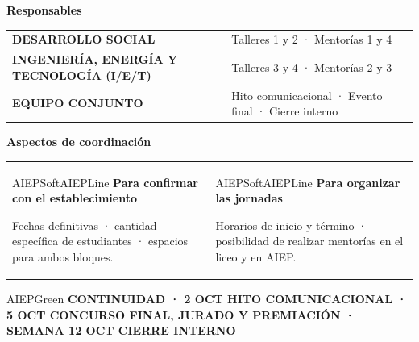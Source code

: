 \documentclass[10pt,a4paper]{article}
\begin{document}
\vspace{4mm}
{\Large\bfseries\color{AIEPNavy}Responsables\par}
\vspace{2mm}
\renewcommand{\arraystretch}{1.32}
\begin{tabularx}{\textwidth}{@{}L{58mm}Y@{}}
{\bfseries\color{AIEPRed}DESARROLLO SOCIAL} & Talleres 1 y 2 · Mentorías 1 y 4 \\[1.3mm]
{\bfseries\color{AIEPNavyMid}INGENIERÍA, ENERGÍA Y TECNOLOGÍA (I/E/T)} & Talleres 3 y 4 · Mentorías 2 y 3 \\[1.3mm]
{\bfseries\color{AIEPGreen}EQUIPO CONJUNTO} & Hito comunicacional · Evento final · Cierre interno \\
\end{tabularx}
\renewcommand{\arraystretch}{1}

\vspace{5mm}
{\Large\bfseries\color{AIEPNavy}Aspectos de coordinación\par}
\vspace{2mm}
\begin{tabularx}{\textwidth}{@{}Y@{\hspace{4mm}}Y@{}}
\begin{modebox}[height=31mm]{AIEPSoft}{AIEPLine}
\textbf{Para confirmar con el establecimiento}\par
\vspace{1.5mm}
Fechas definitivas · cantidad específica de estudiantes · espacios para ambos bloques.
\end{modebox}
&
\begin{modebox}[height=31mm]{AIEPSoft}{AIEPLine}
\textbf{Para organizar las jornadas}\par
\vspace{1.5mm}
Horarios de inicio y término · posibilidad de realizar mentorías en el liceo y en AIEP.
\end{modebox}
\end{tabularx}

\begin{sectionbar}{AIEPGreen}
{\bfseries\color{white}CONTINUIDAD · 2 OCT HITO COMUNICACIONAL · 5 OCT CONCURSO FINAL, JURADO Y PREMIACIÓN · SEMANA 12 OCT CIERRE INTERNO}
\end{sectionbar}
\end{document}
